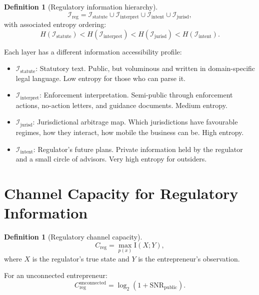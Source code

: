 \documentclass[12pt,a4paper,oneside]{book}
\theoremstyle{definition}
\newtheorem{definition}[theorem]{Definition}
\theoremstyle{remark}
\newcommand{\I}{\mathcal{I}}
\newcommand{\MI}{\mathrm{I}}
\begin{document}
\begin{definition}[Regulatory information hierarchy]
\begin{equation}\label{eq:reg_layers}
  \I_{\text{reg}} = \I_{\text{statute}} \cup \I_{\text{interpret}}
    \cup \I_{\text{intent}} \cup \I_{\text{jurisd}},
\end{equation}
with associated entropy ordering:
\begin{equation}\label{eq:entropy_ordering}
  H(\I_{\text{statute}}) < H(\I_{\text{interpret}})
  < H(\I_{\text{jurisd}}) < H(\I_{\text{intent}}).
\end{equation}
\end{definition}

Each layer has a different information accessibility profile:
\begin{itemize}[nosep]
  \item $\I_{\text{statute}}$: Statutory text. Public, but voluminous and written in
    domain-specific legal language. Low entropy for those who can parse it.
  \item $\I_{\text{interpret}}$: Enforcement interpretation. Semi-public through
    enforcement actions, no-action letters, and guidance documents. Medium entropy.
  \item $\I_{\text{jurisd}}$: Jurisdictional arbitrage map. Which jurisdictions have
    favourable regimes, how they interact, how mobile the business can be. High entropy.
  \item $\I_{\text{intent}}$: Regulator's future plans. Private information held by the
    regulator and a small circle of advisors. Very high entropy for outsiders.
\end{itemize}

\section{Channel Capacity for Regulatory Information}

\begin{definition}[Regulatory channel capacity]
\begin{equation}\label{eq:channel_capacity}
  C_{\text{reg}} = \max_{p(x)} \MI(X; Y),
\end{equation}
where $X$ is the regulator's true state and $Y$ is the entrepreneur's observation.
\end{definition}

For an unconnected entrepreneur:
\begin{equation}\label{eq:low_capacity}
  C_{\text{reg}}^{\text{unconnected}} = \log_2(1 + \text{SNR}_{\text{public}}).
\end{equation}
\end{document}
